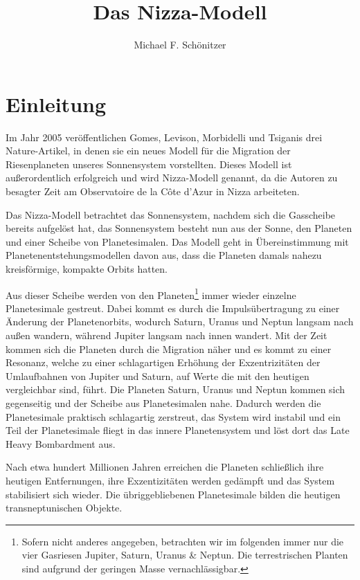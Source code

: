 \documentclass[12pt,a4paper,twoside]{article}
\author{Michael F. Schönitzer}
\title{Das Nizza-Modell}
\begin{document}
\maketitle

\section{Einleitung}
Im Jahr 2005 veröffentlichen Gomes, Levison, Morbidelli und Tsiganis drei Nature-Artikel\cite{Tsiganis2005,Morbidelli2005,Gomes2005},
in denen sie ein neues Modell für die Migration der Riesenplaneten unseres Sonnensystem vorstellten. Dieses Modell ist außerordentlich erfolgreich und wird Nizza-Modell genannt, da die Autoren zu besagter Zeit am Observatoire de la Côte d’Azur in Nizza arbeiteten.

Das Nizza-Modell betrachtet das Sonnensystem, nachdem sich die Gasscheibe bereits aufgelöst hat, das Sonnensystem besteht nun aus der Sonne, den Planeten und einer Scheibe von Planetesimalen. Das Modell geht in Übereinstimmung mit Planetenentstehungsmodellen davon aus, dass die Planeten damals nahezu kreisförmige, kompakte Orbits hatten.

Aus dieser Scheibe werden von den Planeten\footnote{Sofern nicht anderes angegeben, betrachten wir im folgenden immer nur die vier Gasriesen Jupiter, Saturn, Uranus \& Neptun. Die terrestrischen Planten sind aufgrund der geringen Masse vernachlässigbar.} immer wieder einzelne Planetesimale gestreut.
Dabei kommt es durch die Impulsübertragung zu einer Änderung der Planeten\-orbits\cite{Tsiganis2005},
wodurch Saturn, Uranus und Neptun langsam nach außen wandern, während Jupiter langsam nach innen wandert\cite{Hahn1999,Tsiganis2005}.
Mit der Zeit kommen sich die Planeten durch die Migration näher und es kommt zu einer Resonanz,
welche zu einer schlagartigen Erhöhung der Exzentrizitäten der Umlaufbahnen von Jupiter und Saturn, auf Werte die mit den heutigen vergleichbar sind, führt.
Die Planeten Saturn, Uranus und Neptun kommen sich gegenseitig und der Scheibe aus Planetesimalen nahe. Dadurch werden die Planetesimale praktisch schlagartig zerstreut, das System wird instabil und ein Teil der Planetesimale fliegt in das innere Planetensystem und löst dort das Late Heavy Bombardment aus.

Nach etwa hundert Millionen Jahren erreichen die Planeten schließlich ihre heutigen Entfernungen, ihre Exzentizitäten werden gedämpft und das System stabilisiert sich wieder. Die übriggebliebenen Planetesimale bilden die heutigen transneptunischen Objekte.
\end{document}
